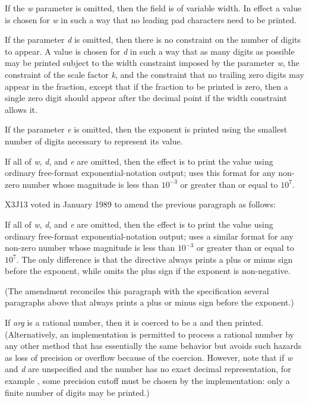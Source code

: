 \begin{flushdesc}
If the \emph{w} parameter is omitted, then the field is of variable width.
In effect a value is chosen
for \emph{w} in such a way that no leading pad characters need to be printed.

If the parameter \emph{d} is omitted, then there is no constraint
on the number of digits to appear.
A value is chosen for \emph{d} in such a way that as many digits
as possible may be printed subject to the width constraint
imposed by the parameter \emph{w}, the constraint of the scale factor \emph{k},
and the constraint that no trailing
zero digits may appear in the fraction, except that if the
fraction to be printed is zero, then a single zero digit should
appear after the decimal point if the width constraint allows it.

If the parameter \emph{e} is omitted, then the exponent is printed
using the smallest number of digits necessary to represent its value.

If all of \emph{w}, \emph{d}, and \emph{e} are omitted, then the effect is to print
the value using ordinary free-format exponential-notation output;
 uses this format for any non-zero number whose magnitude
is less than $10^{-3}$ or greater than or equal to $10^7$.

\begin{new}
X3J13 voted in January 1989
to amend the previous paragraph as follows:

If all of \emph{w}, \emph{d}, and \emph{e} are omitted, then the effect is to print
the value using ordinary free-format exponential-notation output;
 uses a similar format for any non-zero number whose magnitude
is less than $10^{-3}$ or greater than or equal to $10^7$.
The only difference is that the  directive always prints
a plus or minus sign before the exponent, while  omits the plus sign
if the exponent is non-negative.

(The amendment reconciles this paragraph with the specification several
paragraphs above that  always prints
a plus or minus sign before the exponent.)
\end{new}

If \emph{arg} is a rational number, then it is coerced to be a 
and then printed.  (Alternatively, an implementation is permitted to
process a rational number by any other method that has essentially the
same behavior but avoids such hazards as loss of precision or overflow
because of the coercion.  However, note that if \emph{w} and \emph{d} are
unspecified and the number has no exact decimal representation,
for example , some precision cutoff must be chosen
by the implementation: only a finite number of digits may be printed.)


\end{flushdesc}
